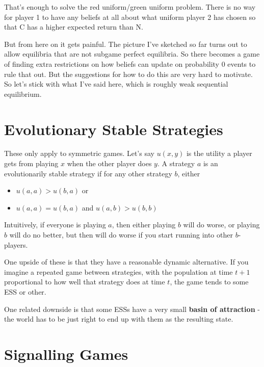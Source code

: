 \documentclass[11pt,]{article}
\providecommand{\tightlist}{%
  \setlength{\itemsep}{0pt}\setlength{\parskip}{0pt}}
\begin{document}
That's enough to solve the red uniform/green uniform problem. There is
no way for player 1 to have any beliefs at all about what uniform player
2 has chosen so that C has a higher expected return than N.

But from here on it gets painful. The picture I've sketched so far turns
out to allow equilibria that are not subgame perfect equilibria. So
there becomes a game of finding extra restrictions on how beliefs can
update on probability 0 events to rule that out. But the suggestions for
how to do this are very hard to motivate. So let's stick with what I've
said here, which is roughly weak sequential equilibrium.

\hypertarget{evolutionary-stable-strategies}{%
\section{Evolutionary Stable
Strategies}\label{evolutionary-stable-strategies}}

These only apply to symmetric games. Let's say \(u(x, y)\) is the
utility a player gets from playing \(x\) when the other player does
\(y\). A strategy \(a\) is an evolutionarily stable strategy if for any
other strategy \(b\), either

\begin{itemize}
\tightlist
\item
  \(u(a, a) > u(b, a)\) or
\item
  \(u(a, a) = u(b, a)\) and \(u(a, b) > u(b, b)\)
\end{itemize}

Intuitively, if everyone is playing \(a\), then either playing \(b\)
will do worse, or playing \(b\) will do no better, but then will do
worse if you start running into other \(b\)-players.

One upside of these is that they have a reasonable dynamic alternative.
If you imagine a repeated game between strategies, with the population
at time \(t+1\) proportional to how well that strategy does at time
\(t\), the game tends to some ESS or other.

One related downside is that some ESSs have a very small \textbf{basin
of attraction} - the world has to be just right to end up with them as
the resulting state.

\newpage

\hypertarget{signalling-games}{%
\section{Signalling Games}\label{signalling-games}}
\end{document}
